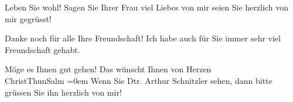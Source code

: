 \pstart
           Leben Sie wohl! Sagen Sie Ihrer Frau viel Liebes von mir {\kaufmannsund} seien Sie herzlich
               von mir gegrüsst!\pend
           
\pstart
           {\pb}Danke noch für alle Ihre
               Freundschaft! Ich habe auch für Sie immer sehr viel Freundschaft gehabt.\pend
           
\pstart
           Möge es Ihnen gut gehen! Das wünscht Ihnen von Herzen{\\[\baselineskip]}\spacefill\mbox{ChristThunSalm}\pend
           \leftskip=0em{}
\pstart
           \noindent{}Wenn Sie Dtr. Arthur Schnitzler sehen, dann bitte grüssen Sie ihn herzlich von
                  mir!\pend
           \endnumbering{}  
      